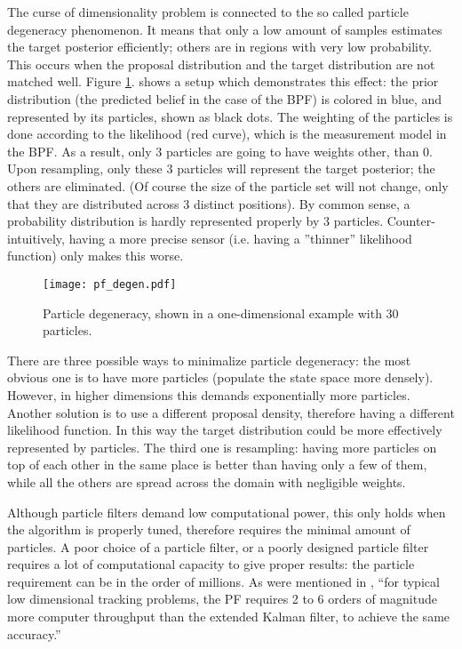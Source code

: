 The curse of dimensionality problem is connected to the so called particle degeneracy phenomenon. It means that only a low amount of samples estimates the target posterior efficiently; others are in regions with very low probability. This occurs when the proposal distribution and the target distribution are not matched well. Figure \ref{fig:pf-degen}. shows a setup which demonstrates this effect: the prior distribution (the predicted belief in the case of the BPF) is colored in blue, and represented by its particles, shown as black dots. The weighting of the particles is done according to the likelihood (red curve), which is the measurement model in the BPF. As a result, only 3 particles are going to have weights other, than 0. Upon resampling, only these 3 particles will represent the target posterior; the others are eliminated. (Of course the size of the particle set will not change, only that they are distributed across 3 distinct positions). By common sense, a probability distribution is hardly represented properly by 3 particles. Counter-intuitively, having a more precise sensor (i.e. having a ''thinner'' likelihood function) only makes this worse.

\begin{figure}[htb!]
    \centering
    \texttt{[image: pf\_degen.pdf]}
    \caption{Particle degeneracy, shown in a one-dimensional example with 30 particles.}
    \label{fig:pf-degen}
\end{figure}
There are three possible ways to minimalize particle degeneracy: the most obvious one is to have more particles (populate the state space more densely). However, in higher dimensions this demands exponentially more particles. Another solution is to use a different proposal density, therefore having a different likelihood function. In this way the target distribution could be more effectively represented by particles. The third one is resampling: having more particles on top of each other in the same place is better than having only a few of them, while all the others are spread across the domain with negligible weights.


Although particle filters demand low computational power, this only holds when the algorithm is properly tuned, therefore requires the minimal amount of particles. A poor choice of a particle filter, or a poorly designed particle filter requires a lot of computational capacity to give proper results: the particle requirement can be in the order of millions. As were mentioned in \cite{curse_of_dim}, ``for typical low dimensional tracking problems, the PF requires 2 to 6 orders of magnitude more computer throughput than the extended Kalman filter, to achieve the same accuracy.''

